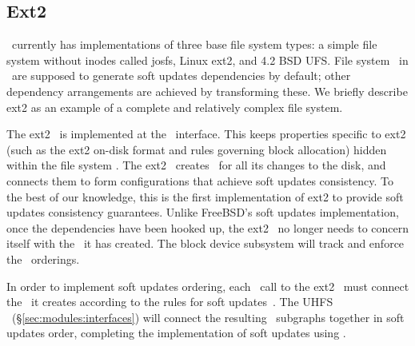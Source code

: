 \subsection{Ext2}
\label{sec:modules:ext2}

\Kudos\ currently has implementations of three base file system types: a simple
file system without inodes called josfs, Linux ext2, and 4.2 BSD UFS. File
system \modules\ in \Kudos\ are supposed to generate soft updates dependencies
by default; other dependency arrangements are achieved by transforming these.
We briefly describe ext2 as an example of a complete and relatively complex file
system.

The ext2 \module\ is implemented at the \LFS\ interface. This keeps properties
specific to ext2 (such as the ext2 on-disk format and rules governing block
allocation) hidden within the file system \module. The ext2 \module\ creates
\chdescs\ for all its changes to the disk, and connects them to form
configurations that achieve soft updates consistency. To the best of our
knowledge, this is the first implementation of ext2 to provide soft updates
consistency guarantees. Unlike FreeBSD's soft updates implementation, once the
dependencies have been hooked up, the ext2 \module\ no longer needs to concern
itself with the \chdescs\ it has created. The block device subsystem will track
and enforce the \chdesc\ orderings.

In order to implement soft updates ordering, each \LFS\ call to the ext2
\module\ must connect the \chdescs\ it creates according to the rules for soft
updates~\cite{ganger00soft}. The UHFS \module\ (\S\ref{sec:modules:interfaces})
will connect the resulting \chdesc\ subgraphs together in soft updates order,
completing the implementation of soft updates using \chdescs.
